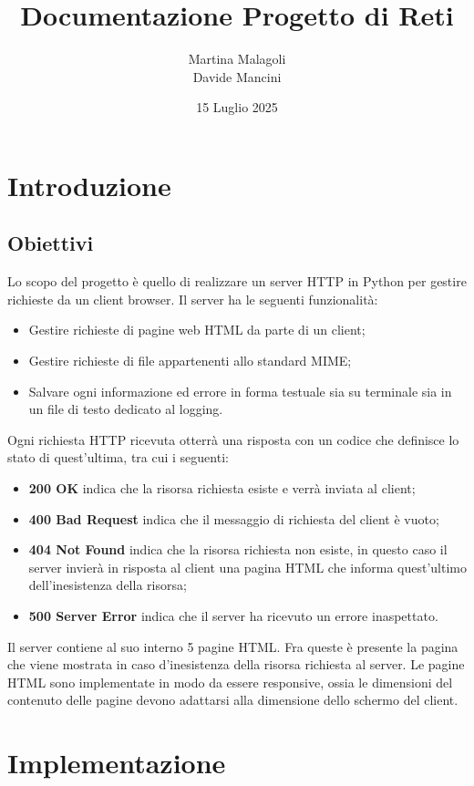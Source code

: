 \documentclass[a4paper,12pt]{report}
\title{Documentazione Progetto di Reti}
\author{Martina Malagoli\\Davide Mancini}
\date{15 Luglio 2025}
\begin{document}
\maketitle
\newpage

\tableofcontents

\chapter{Introduzione}
\section{Obiettivi}

Lo scopo del progetto è quello di realizzare un server HTTP in Python per gestire richieste da un client browser.
Il server ha le seguenti funzionalità:
\begin{itemize}
	\item Gestire richieste di pagine web HTML da parte di un client;
    \item Gestire richieste di file appartenenti allo standard MIME;
    \item Salvare ogni informazione ed errore in forma testuale sia su terminale sia in un file di testo dedicato al logging.
\end{itemize}
%
Ogni richiesta HTTP ricevuta otterrà una risposta con un codice che definisce lo stato di quest'ultima, tra cui i seguenti:
\begin{itemize}
	\item \textbf{200 OK} indica che la risorsa richiesta esiste e verrà inviata al client;
    \item \textbf{400 Bad Request} indica che il messaggio di richiesta del client è vuoto;
    \item \textbf{404 Not Found} indica che la risorsa richiesta non esiste, in questo caso il server invierà in risposta al client una pagina HTML che informa quest'ultimo dell'inesistenza della risorsa;
    \item \textbf{500 Server Error} indica che il server ha ricevuto un errore inaspettato.
\end{itemize}
%
Il server contiene al suo interno 5 pagine HTML. Fra queste è presente la pagina che viene mostrata in caso d'inesistenza della risorsa richiesta al server. Le pagine HTML sono implementate in modo da essere responsive, ossia le dimensioni del contenuto delle pagine devono adattarsi alla dimensione dello schermo del client.

\chapter{Implementazione}
\end{document}
